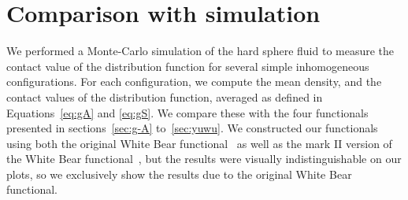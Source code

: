 



\section{Comparison with simulation}\label{sec:comparison}

We performed a Monte-Carlo simulation of the hard sphere fluid to
measure the contact value of the distribution function for several
simple inhomogeneous configurations.  For each configuration, we
compute the mean density, and the contact values of the distribution
function, averaged as defined in Equations~\ref{eq:gA} and
\ref{eq:gS}.  We compare these with the four functionals presented in
sections~\ref{sec:g-A} to~\ref{sec:yuwu}.  We constructed our
functionals using both the original White Bear
functional~\cite{roth2002whitebear} as well as the mark II version of
the White Bear functional~\cite{hansen2006density}, but the results
were visually indistinguishable on our plots, so we exclusively show
the results due to the original White Bear functional.

